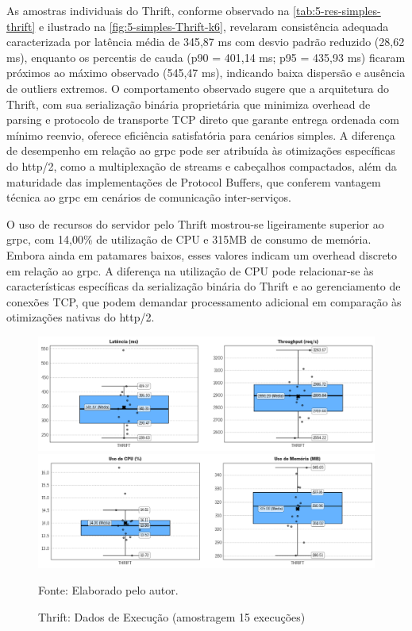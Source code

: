 As amostras individuais do Thrift, conforme observado na \autoref{tab:5-res-simples-thrift} e ilustrado na \autoref{fig:5-simples-Thrift-k6}, revelaram consistência adequada caracterizada por latência média de 345,87 ms com desvio padrão reduzido (28,62 ms), enquanto os percentis de cauda (p90 = 401,14 ms; p95 = 435,93 ms) ficaram próximos ao máximo observado (545,47 ms), indicando baixa dispersão e ausência de outliers extremos. O comportamento observado sugere que a arquitetura do Thrift, com sua serialização binária proprietária que minimiza overhead de parsing e protocolo de transporte TCP direto que garante entrega ordenada com mínimo reenvio, oferece eficiência satisfatória para cenários simples. A diferença de desempenho em relação ao \gls{grpc} pode ser atribuída às otimizações específicas do \acrshort{http}/2, como a multiplexação de streams e cabeçalhos compactados, além da maturidade das implementações de Protocol Buffers, que conferem vantagem técnica ao \gls{grpc} em cenários de comunicação inter-serviços.

O uso de recursos do servidor pelo Thrift mostrou-se ligeiramente superior ao \gls{grpc}, com 14,00\% de utilização de CPU e 315MB de consumo de memória. Embora ainda em patamares baixos, esses valores indicam um overhead discreto em relação ao \gls{grpc}. A diferença na utilização de CPU pode relacionar-se às características específicas da serialização binária do Thrift e ao gerenciamento de conexões TCP, que podem demandar processamento adicional em comparação às otimizações nativas do \acrshort{http}/2.

\begin{figure}[H]
    \caption{Thrift: Dados de Execução (amostragem 15 execuções)}
    \label{fig:5-simples-Thrift-k6}
    \centering
    \includegraphics[width=1\linewidth]{imagens//resultados/5-resultados-simples-Thrift-k6.png}
    \includegraphics[width=1\linewidth]{imagens//resultados/5-resultados-simples-Thrift-prometheus.png}    
    {\par \raggedright \footnotesize Fonte: Elaborado pelo autor.\par}
\end{figure}



